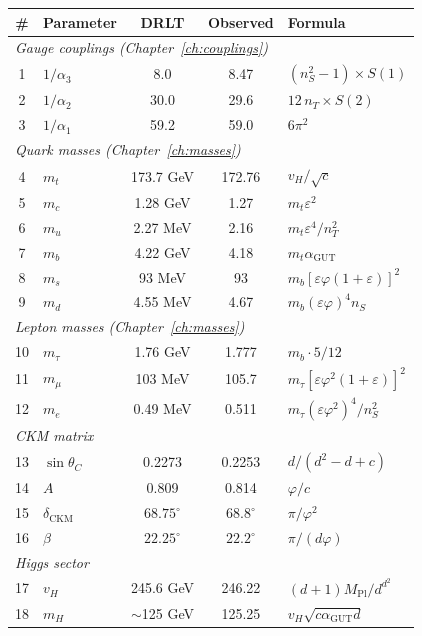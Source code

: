 \begin{center}
\small
\begin{tabular}{clccl}
\hline
\# & Parameter & DRLT & Observed & Formula \\
\hline
\multicolumn{5}{l}{\emph{Gauge couplings (Chapter~\ref{ch:couplings})}} \\
1 & $1/\alpha_3$ & 8.0 & 8.47 & $(n_S^2-1) \times S(1)$ \\
2 & $1/\alpha_2$ & 30.0 & 29.6 & $12\,n_T \times S(2)$ \\
3 & $1/\alpha_1$ & 59.2 & 59.0 & $6\pi^2$ \\
\hline
\multicolumn{5}{l}{\emph{Quark masses (Chapter~\ref{ch:masses})}} \\
4 & $m_t$ & 173.7 GeV & 172.76 & $v_H/\sqrt{c}$ \\
5 & $m_c$ & 1.28 GeV & 1.27 & $m_t\varepsilon^2$ \\
6 & $m_u$ & 2.27 MeV & 2.16 & $m_t\varepsilon^4/n_T^2$ \\
7 & $m_b$ & 4.22 GeV & 4.18 & $m_t\alpha_\text{GUT}$ \\
8 & $m_s$ & 93 MeV & 93 & $m_b[\varepsilon\varphi(1\!+\!\varepsilon)]^2$ \\
9 & $m_d$ & 4.55 MeV & 4.67 & $m_b(\varepsilon\varphi)^4 n_S$ \\
\hline
\multicolumn{5}{l}{\emph{Lepton masses (Chapter~\ref{ch:masses})}} \\
10 & $m_\tau$ & 1.76 GeV & 1.777 & $m_b \cdot 5/12$ \\
11 & $m_\mu$ & 103 MeV & 105.7 & $m_\tau[\varepsilon\varphi^2(1\!+\!\varepsilon)]^2$ \\
12 & $m_e$ & 0.49 MeV & 0.511 & $m_\tau(\varepsilon\varphi^2)^4/n_S^2$ \\
\hline
\multicolumn{5}{l}{\emph{CKM matrix}} \\
13 & $\sin\theta_C$ & 0.2273 & 0.2253 & $d/(d^2\!-\!d\!+\!c)$ \\
14 & $A$ & 0.809 & 0.814 & $\varphi/c$ \\
15 & $\delta_\text{CKM}$ & $68.75^\circ$ & $68.8^\circ$ & $\pi/\varphi^2$ \\
16 & $\beta$ & $22.25^\circ$ & $22.2^\circ$ & $\pi/(d\varphi)$ \\
\hline
\multicolumn{5}{l}{\emph{Higgs sector}} \\
17 & $v_H$ & 245.6 GeV & 246.22 & $(d\!+\!1)M_\text{Pl}/d^{d^2}$ \\
18 & $m_H$ & $\sim$125 GeV & 125.25 & $v_H\sqrt{c\alpha_\text{GUT}d}$ \\
\hline

\end{tabular}
\end{center}
